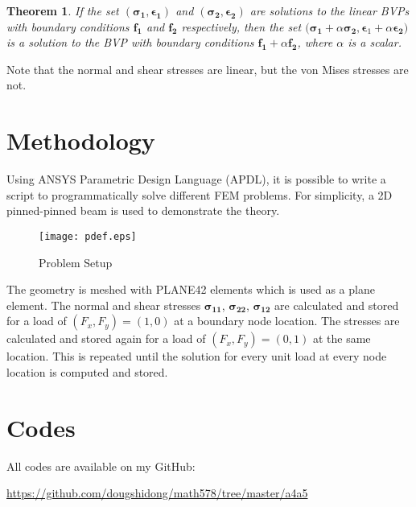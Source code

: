 \documentclass[letterpaper,12pt,]{article}
\begin{document}
\newtheorem{theorem}{Theorem}
\begin{theorem}
If the set $(\boldsymbol{\sigma_{1}}, \boldsymbol{\epsilon_{1}})$ and $(\boldsymbol{\sigma_{2}}, \boldsymbol{\epsilon_{2}})$ are solutions to the linear BVPs with boundary conditions $\mathbf{f_{1}}$ and $\mathbf{f_{2}}$ respectively, then the set $\boldsymbol{(\sigma_{1}} + \alpha\boldsymbol{\sigma_{2}}, \boldsymbol\epsilon_{1}+\alpha\boldsymbol{\epsilon_{2}})$ is a solution to the BVP with boundary conditions $\mathbf{f_{1}} + \alpha \mathbf{f_{2}}$, where $\alpha$ is a scalar.
\label{th:pos}
\end{theorem}

Note that the normal and shear stresses are linear, but the von Mises stresses are not.

\section*{Methodology}

Using ANSYS Parametric Design Language (APDL), it is possible to write a script to programmatically solve different FEM problems. For simplicity, a 2D pinned-pinned beam is used to demonstrate the theory.

\begin{figure}[h]
\centering
\texttt{[image: pdef.eps]}
\caption{Problem Setup}
\label{fig:pdef}
\end{figure}
The geometry is meshed with PLANE42 elements which is used as a plane element. The normal and shear stresses $\boldsymbol{\sigma_{11}}$, $\boldsymbol{\sigma_{22}}$, $\boldsymbol{\sigma_{12}}$ are calculated and stored for a load of $(F_x,F_y) = (1, 0)$ at a boundary node location. The stresses are calculated and stored again for a load of $(F_x,F_y) = (0, 1)$ at the same location. This is repeated until the solution for every unit load at every node location is computed and stored.

\section*{Codes}

All codes are available on my GitHub:

\url{https://github.com/dougshidong/math578/tree/master/a4a5}
\end{document}
